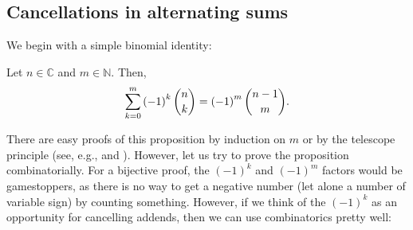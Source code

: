 \subsection{\label{sec.sign.intro}Cancellations in alternating sums}

We begin with a simple binomial identity:

\begin{proposition}
\label{prop.binom.nhs}Let $n\in\mathbb{C}$ and
$m\in\mathbb{N}$. Then,%
\begin{equation}
\sum_{k=0}^{m}\left(  -1\right)  ^{k}\dbinom{n}{k}=\left(  -1\right)
^{m}\dbinom{n-1}{m}. \label{eq.prop.binom.nhs.eq}%
\end{equation}

\end{proposition}

There are easy proofs of this proposition by induction on $m$ or by the
telescope principle (see, e.g., \cite[Exercise 4]{18f-hw2s} and \cite[Exercise
2.1.1 \textbf{(a)} and \S 7.27]{19fco}). However, let us try to prove the
proposition combinatorially. For a bijective proof, the $\left(  -1\right)
^{k}$ and $\left(  -1\right)  ^{m}$ factors would be gamestoppers, as there is
no way to get a negative number (let alone a number of variable sign) by
counting something. However, if we think of the $\left(  -1\right)  ^{k}$ as
an opportunity for cancelling addends, then we can use combinatorics pretty well:

